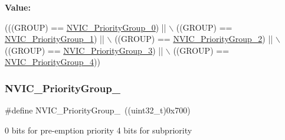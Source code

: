 {\bfseries Value\+:}
\begin{DoxyCode}
(((GROUP) == \mbox{\hyperlink{group___m_i_s_c___preemption___priority___group_gaeac0cf537f65d17bc19aee2410b2b60e}{NVIC\_PriorityGroup\_0}}) || \(\backslash\)
                                       ((GROUP) == \mbox{\hyperlink{group___m_i_s_c___preemption___priority___group_ga89bf0bf9e70f1a372a541b1b8d7493aa}{NVIC\_PriorityGroup\_1}}) || \(\backslash\)
                                       ((GROUP) == \mbox{\hyperlink{group___m_i_s_c___preemption___priority___group_ga505002e8b76aef65499ca371e40ec8b4}{NVIC\_PriorityGroup\_2}}) || \(\backslash\)
                                       ((GROUP) == \mbox{\hyperlink{group___m_i_s_c___preemption___priority___group_ga49bdbee77d4a70339d63c80462d49b4d}{NVIC\_PriorityGroup\_3}}) || \(\backslash\)
                                       ((GROUP) == \mbox{\hyperlink{group___m_i_s_c___preemption___priority___group_gaf9020c585da2a299328f0b06dee391a2}{NVIC\_PriorityGroup\_4}}))
\end{DoxyCode}
\mbox{\label{group___m_i_s_c___preemption___priority___group_gaeac0cf537f65d17bc19aee2410b2b60e}} 
\subsubsection{\texorpdfstring{N\+V\+I\+C\+\_\+\+Priority\+Group\+\_}{NVIC\_PriorityGroup\_0}}
{\footnotesize\ttfamily \#define N\+V\+I\+C\+\_\+\+Priority\+Group\+\_~((uint32\+\_\+t)0x700)}

0 bits for pre-\/emption priority 4 bits for subpriority \mbox{\label{group___m_i_s_c___preemption___priority___group_ga89bf0bf9e70f1a372a541b1b8d7493aa}} 

